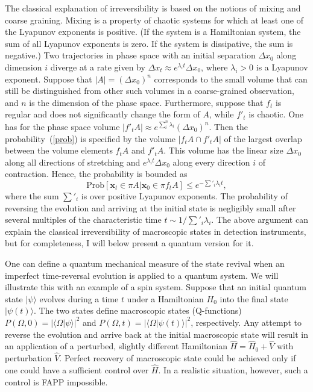 \documentclass[12pt]{article}
\begin{document}
The classical explanation of irreversibility is based on the notions of mixing and coarse graining. Mixing is a property of chaotic systems for which at least one of the Lyapunov exponents is positive. (If the system is a Hamiltonian system, the sum of all Lyapunov exponents is zero. If the system is dissipative, the sum is negative.) Two trajectories in phase space with an initial separation $\Delta x_0$ along dimension $i$ diverge at a rate given by $ \Delta x_t  \approx e^{\lambda_i t}  \Delta x_0 $, where $\lambda_i>0$ is a Lyapunov exponent. Suppose that $|A|=(\Delta x_0)^n$ corresponds to the small volume that can still be distinguished from other such volumes in a coarse-grained observation, and $n$ is the dimension of the phase space. Furthermore, suppose that $f_t$ is regular and does not significantly change the form of $A$, while $f'_t$ is chaotic. One has for the phase space volume $|f'_t A| \approx e^{\sum_i^n \lambda_i} (\Delta x_0)^n$. Then the probability~(\ref{prob}) is specified by the volume $|f_t A \cap f'_t A|$ of the largest overlap between the volume elements $f_t A$ and $f'_t A$. This volume has the linear size $\Delta x_0$ along all directions of stretching  and $ e^{\lambda_i t} \Delta x_0$ along every direction $i$ of contraction. Hence, the probability is bounded as
\begin{equation}
\mbox{Prob}[\mathbf{x}_t \in \pi A| \mathbf{x}_0 \in \pi f_t A] \leq e^{-\sum'_{i} \lambda_it}, 
\end{equation}
where the sum $\sum'_i$ is over positive Lyapunov exponents. The probability of reversing the evolution and arriving at the initial state is negligibly small after several multiples of the characteristic time $t \sim 1/\sum'_i \lambda_i$. The above argument can explain the classical irreversibility of macroscopic states in detection instruments, but for completeness, I will below present a quantum version for it.

One can define a quantum mechanical measure of the state revival when an imperfect time-reversal evolution is applied to a quantum system. We will illustrate this with an example of a spin system. Suppose that an initial quantum state $|\psi\rangle$ evolves during a time $t$ under a Hamiltonian $H_0$ into the final state $|\psi(t)\rangle$. The two states define macroscopic states (Q-functions) $P(\Omega,0)=|\langle \Omega | \psi \rangle|^2$ and $P(\Omega,t)=|\langle \Omega | \psi(t) \rangle|^2$, respectively. Any attempt to reverse the evolution and arrive back at the initial macroscopic state will result in an application of a perturbed, slightly different Hamiltonian $\hat{H}=\hat{H}_0+\hat{V}$ with perturbation $\hat{V}$. Perfect recovery of macroscopic state could be achieved only if one could have a sufficient control over $\hat{H}$. In a realistic situation, however, such a control is FAPP impossible. 
\end{document}
